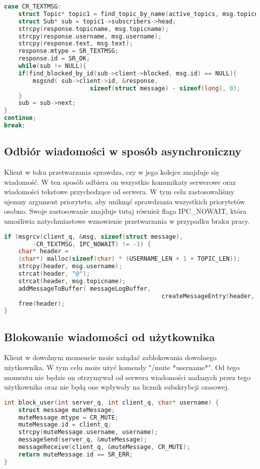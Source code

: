 \documentclass{article}
\begin{document}
	\begin{lstlisting}[language=c,
		numbersep=5pt,
		tabsize=2,
		showstringspaces=false]
case CR_TEXTMSG:
	struct Topic* topic1 = find_topic_by_name(active_topics, msg.topicname);
	struct Sub* sub = topic1->subscribers->head;
	strcpy(response.topicname, msg.topicname);
	strcpy(response.username, msg.username);
	strcpy(response.text, msg.text);
	response.mtype = SR_TEXTMSG;
	response.id = SR_OK;
	while(sub != NULL){
	if(find_blocked_by_id(sub->client->blocked, msg.id) == NULL){ 
		msgsnd(	sub->client->id, &response, 
						sizeof(struct message) - sizeof(long), 0);
	}
	sub = sub->next;
}
continue;
break;
	\end{lstlisting}
	\subsection{Odbiór wiadomości w sposób asynchroniczny}
	Klient w toku przetwarzania sprawdza, czy w jego kolejce znajduje się wiadomość. W ten sposób odbiera on wszystkie komunikaty serwerowe oraz wiadomości tekstowe przychodzące od serwera. W tym celu zastosowaliśmy ujemny argument priorytetu, aby uniknąć sprawdzania wszystkich priorytetów osobno. Swoje zastosowanie znajduje tutaj również flaga IPC\_NOWAIT, która umożliwia natychmiastowe wznowienie przetwarzania w przypadku braku pracy.
	\begin{lstlisting}[language=c,
		numbersep=5pt,
		tabsize=2,
		showstringspaces=false]
if (msgrcv(client_q, &msg, sizeof(struct message), 
		-CR_TEXTMSG, IPC_NOWAIT) != -1) {
	char* header =
	(char*) malloc(sizeof(char) * (USERNAME_LEN + 1 + TOPIC_LEN));
	strcpy(header, msg.username);
	strcat(header, "@");
	strcat(header, msg.topicname);
	addMessageToBuffer(	messageLogBuffer, 
											createMessageEntry(header, msg.text));
	free(header);
}
	\end{lstlisting}
	\subsection{Blokowanie wiadomości od użytkownika}
	Klient w dowolnym momencie może zażądać zablokowania dowolnego użytkownika. W tym celu może użyć komendy "/mute *username*". Od tego momentu nie będzie on otrzymywał od serwera wiadomości nadanych przez tego użytkownika oraz nie będą one wpływały na licznik subskrybcji czasowej.
	\begin{lstlisting}[language=c,
		numbersep=5pt,
		tabsize=2,
		showstringspaces=false]
int block_user(int server_q, int client_q, char* username) {
	struct message muteMessage;
	muteMessage.mtype = CR_MUTE;
	muteMessage.id = client_q;
	strcpy(muteMessage.username, username);
	messageSend(server_q, &muteMessage);
	messageReceive(client_q, &muteMessage, CR_MUTE);
	return muteMessage.id == SR_ERR;
}
	\end{lstlisting}
\end{document}
